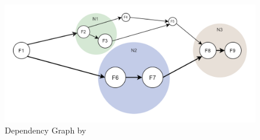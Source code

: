 \documentclass[a4paper,11pt, pagesize]{scrartcl}
\begin{document}
\begin{spacing}{1.2}
\begin{figure}[H]
\label{fig:dependencyGraph}
\centering
\includegraphics[width=1\textwidth]{DependencyGraph}
\caption{Dependency Graph by \cite{shafiei2020serverless}}
\end{figure}

\end{spacing}
\end{document}

